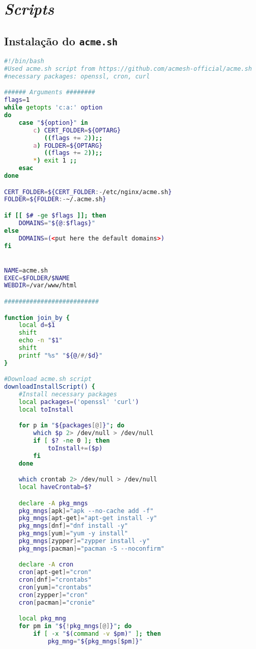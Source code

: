 \chapter{\textit{Scripts}}

\section{Instalação do \texttt{acme.sh}}\label{script:acme}
\begin{lstlisting}[language=bash, caption=\textit{Script} de instalação do \texttt{acme.sh}]
#!/bin/bash
#Used acme.sh script from https://github.com/acmesh-official/acme.sh
#necessary packages: openssl, cron, curl

###### Arguments ########
flags=1
while getopts 'c:a:' option
do
    case "${option}" in
        c) CERT_FOLDER=${OPTARG}
           ((flags += 2));;
        a) FOLDER=${OPTARG}
           ((flags += 2));;
        *) exit 1 ;;
    esac
done

CERT_FOLDER=${CERT_FOLDER:-/etc/nginx/acme.sh}
FOLDER=${FOLDER:-~/.acme.sh}

if [[ $# -ge $flags ]]; then
    DOMAINS="${@:$flags}"
else
    DOMAINS=(<put here the default domains>)
fi


NAME=acme.sh
EXEC=$FOLDER/$NAME
WEBDIR=/var/www/html

##########################

function join_by {
    local d=$1
    shift
    echo -n "$1"
    shift
    printf "%s" "${@/#/$d}"
}

#Download acme.sh script
downloadInstallScript() {
    #Install necessary packages
    local packages=('openssl' 'curl')
    local toInstall

    for p in "${packages[@]}"; do
        which $p 2> /dev/null > /dev/null
        if [ $? -ne 0 ]; then
            toInstall+=($p)
        fi
    done

    which crontab 2> /dev/null > /dev/null
    local haveCrontab=$?

    declare -A pkg_mngs
    pkg_mngs[apk]="apk --no-cache add -f"
    pkg_mngs[apt-get]="apt-get install -y"
    pkg_mngs[dnf]="dnf install -y"
    pkg_mngs[yum]="yum -y install"
    pkg_mngs[zypper]="zypper install -y"
    pkg_mngs[pacman]="pacman -S --noconfirm"

    declare -A cron
    cron[apt-get]="cron"
    cron[dnf]="crontabs"
    cron[yum]="crontabs"
    cron[zypper]="cron"
    cron[pacman]="cronie"

    local pkg_mng
    for pm in "${!pkg_mngs[@]}"; do
        if [ -x "$(command -v $pm)" ]; then
            pkg_mng="${pkg_mngs[$pm]}"


\end{lstlisting}
